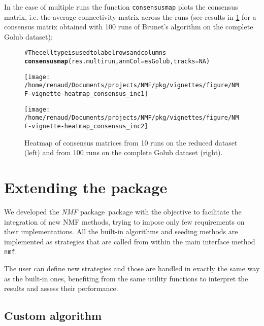 \documentclass[a4paper]{article}\usepackage{graphicx, color}
\makeatletter
\newcommand{\hlfunctioncall}[1]{\textcolor[rgb]{0.501960784313725,0,0.329411764705882}{\textbf{#1}}}%
\newcommand{\hlcomment}[1]{\textcolor[rgb]{0.180392156862745,0.6,0.341176470588235}{#1}}%
\newenvironment{kframe}{%
 \def\at@end@of@kframe{}%
 \ifinner\ifhmode%
  \def\at@end@of@kframe{\end{minipage}}%
  \begin{minipage}{\columnwidth}%
 \fi\fi%
 \def\FrameCommand##1{\hskip\@totalleftmargin \hskip-\fboxsep
 \colorbox{shadecolor}{##1}\hskip-\fboxsep
     \hskip-\linewidth \hskip-\@totalleftmargin \hskip\columnwidth}%
 \MakeFramed {\advance\hsize-\width
   \@totalleftmargin\z@ \linewidth\hsize
   \@setminipage}}%
 {\par\unskip\endMakeFramed%
 \at@end@of@kframe}
\newenvironment{knitrout}{}{} %
\let\code=\texttt
\newcommand{\pkgname}[1]{\textit{#1}\xspace}
\newcommand{\Rpkg}[1]{\pkgname{#1} package\xspace}
\newcommand{\nmfpack}{\Rpkg{NMF}}
\makeatother
\begin{document}
In the case of multiple runs the function \code{consensusmap} plots the consensus matrix, i.e. the average connectivity matrix across the runs (see results in \cref{fig:heatmap_consensus} for a consensus matrix obtained with 100 runs of Brunet's algorithm on the complete 
Golub dataset):

\begin{figure}[ht]
\begin{knitrout}
\color{fgcolor}\begin{kframe}
\begin{alltt}
\hlcomment{# The cell type is used to label rows and columns}
\hlfunctioncall{consensusmap}(res.multirun, annCol = esGolub, tracks = NA)
\end{alltt}
\end{kframe}
\texttt{[image: /home/renaud/Documents/projects/NMF/pkg/vignettes/figure/NMF-vignette-heatmap\_consensus\_inc1]} 

\texttt{[image: /home/renaud/Documents/projects/NMF/pkg/vignettes/figure/NMF-vignette-heatmap\_consensus\_inc2]} 

\end{knitrout}



\caption{Heatmap of consensus matrices from 10 runs on the reduced dataset
(left) and from 100 runs on the complete Golub dataset (right).}
\label{fig:heatmap_consensus}
\end{figure}
 
\section{Extending the package}

We developed the \nmfpack\ package with the objective to facilitate the integration of new NMF methods, trying to impose only few requirements on their implementations. 
All the built-in algorithms and seeding methods are implemented as strategies that are called from within the main interface method \code{nmf}. 

The user can define new strategies and those are handled in exactly the same way as the built-in ones, benefiting from the same utility functions to interpret the 
results and assess their performance. 

\subsection{Custom algorithm}
%
%
\end{document}
